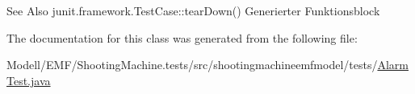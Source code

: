 \begin{DoxySeeAlso}{See Also}
junit.\-framework.\-Test\-Case\-::tear\-Down() Generierter Funktionsblock 
\end{DoxySeeAlso}


The documentation for this class was generated from the following file\-:\begin{DoxyCompactItemize}
\item 
Modell/\-E\-M\-F/\-Shooting\-Machine.\-tests/src/shootingmachineemfmodel/tests/\hyperlink{_alarm_test_8java}{Alarm\-Test.\-java}\end{DoxyCompactItemize}
